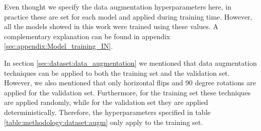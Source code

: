 Even thought we specify the data augmentation hyperparameters here, in practice these are set for each model and applied during training time. However, all the models showed in this work were trained using these values. A complementary explanation can be found in appendix \ref{sec:appendix:Model_training_IN}.

In section \ref{sec:dataset:data_augmentation} we mentioned that data augmentation techniques can be applied to both the training set and the validation set. However, we also mentioned that only horizontal flips and 90 degree rotations are applied for the validation set. Furthermore, for the training set these techniques are applied randomly, while for the validation set they are applied deterministically. Therefore, the hyperparameters specified in table \ref{table:methodology:dataset:augm} only apply to the training set.
